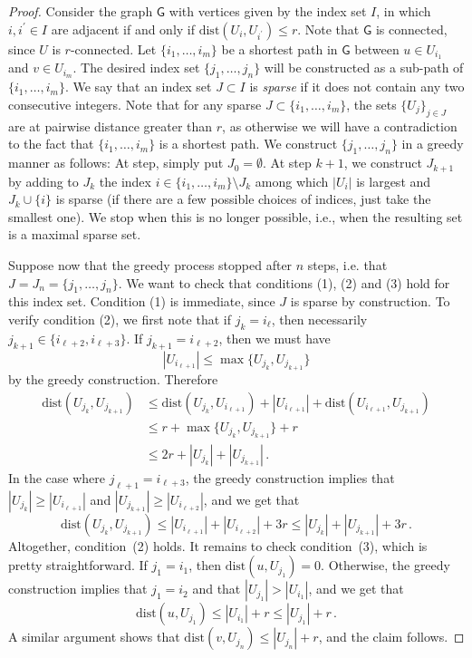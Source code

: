\documentclass[11pt, reqno]{article}
\numberwithin{equation}{section}
\theoremstyle{definition}
\newcommand{\1}{\mathds{1}}
\begin{document}
\begin{proof}
    Consider the graph $\mathsf{G}$ with vertices given by the index set $I$, in which $i,i^\prime\in I$ are adjacent if and only if $\text{dist}(U_{i},U_{i^\prime}) \le r$. Note that $\mathsf{G}$ is connected, since $U$ is $r$-connected. Let $\{i_1,\ldots,i_m\}$ be a shortest path in $\mathsf{G}$ between $u\in U_{i_1}$ and $v\in U_{i_m}$. The desired index set $\{j_1,\ldots,j_n\}$ will be constructed as a sub-path of $\{i_1,\ldots,i_m\}$. We say that an index set $J\subset I$ is \emph{sparse} if it does not contain any two consecutive integers. Note that for any sparse $J\subset \{i_1,\ldots ,i_m\}$, the sets $\{U_{j}\}_{j\in J}$ are at pairwise distance greater than $r$, as otherwise we will have a contradiction to the fact that $\{i_1,\ldots,i_m\}$ is a shortest path. We construct $\{j_1,\ldots,j_n\}$ in a greedy manner as follows: At step, simply put $J_0 = \emptyset$. At step $k+1$, we construct $J_{k+1}$ by adding to $J_k$ the index $i\in \{i_1,\ldots,i_m\}\setminus J_k$ among which $|U_i|$ is largest and $J_k\cup\{i\}$ is sparse (if there are a few possible choices of indices, just take the smallest one). We stop when this is no longer possible, i.e., when the resulting set is a maximal sparse set. 

    Suppose now that the greedy process stopped after $n$ steps, i.e. that $J=J_n = \{j_1,\ldots,j_n\}$. We want to check that conditions (1), (2) and (3) hold for this index set. Condition (1) is immediate, since $J$ is sparse by construction. To verify condition (2), we first note that if $j_k = i_{\ell}$, then necessarily $j_{k+1} \in \{i_{\ell + 2},i_{\ell + 3} \}$. If $j_{k+1} = i_{\ell +2}$, then we must have
    \[
    |U_{i_{\ell + 1}}| \le \max \{U_{j_{k}},U_{j_{k+1}}\}
    \]
    by the greedy construction. Therefore
    \begin{align*}
        \text{dist}(U_{j_{k}},U_{j_{k+1}} ) &\le \text{dist}(U_{j_{k}},U_{i_{\ell + 1}} ) + |U_{i_{\ell + 1}}| + \text{dist}(U_{i_{\ell + 1}},U_{j_{k+1}} ) \\ & \le r + \max \{U_{j_{k}},U_{j_{k+1}}\} + r \\ &\le 2r + |U_{j_{k}}| + |U_{j_{k+1}}| \, .     
    \end{align*}
    In the case where $j_{\ell + 1} = i_{\ell +3}$, the greedy construction implies that $|U_{j_{k}}| \ge |U_{i_{\ell + 1}}|$ and $|{U_{j_{k+1}}}|\ge |U_{i_{\ell + 2}}|$, and we get that
    \[
    \text{dist}(U_{j_{k}},U_{j_{k+1}} ) \le |U_{i_{\ell+1}}|+ |U_{i_{\ell+2}}| + 3r \le  |U_{j_{k}}| + |U_{j_{k+1}}| + 3r \, .
    \]
    Altogether, condition~(2) holds. It remains to check condition~(3), which is pretty straightforward. If $j_1 = i_1$, then $\text{dist}(u,U_{j_1}) = 0$. Otherwise, the greedy construction implies that $j_1 = i_2$ and that $|U_{j_{1}}| > |U_{i_1}|$, and we get that
    \[
    \text{dist}(u,U_{j_1}) \le |U_{i_1}| + r \le |U_{j_1}| + r \, .  
    \]
    A similar argument shows that $\text{dist}(v,U_{j_n}) \le |U_{j_n}| + r$, and the claim follows. 
\end{proof}
\end{document}
